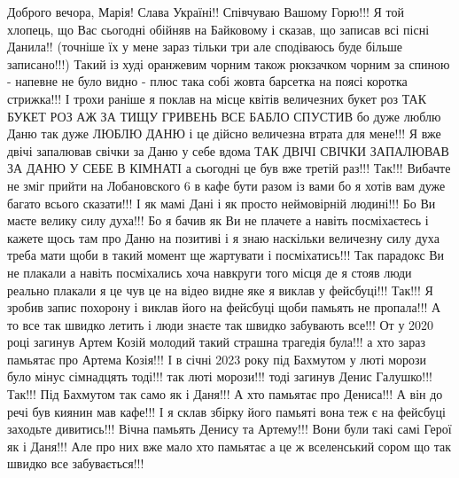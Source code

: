  
 
 
 
 

Доброго вечора, Марія! Слава Україні!! Співчуваю Вашому Горю!!! Я той хлопець,
що Вас сьогодні обійняв на Байковому і сказав, що записав всі пісні Данила!!
(точніше їх у мене зараз тільки три але сподіваюсь буде більше записано!!!)
Такий із худі оранжевим чорним також рюкзачком чорним за спиною - напевне не
було видно - плюс така собі жовта барсетка на поясі коротка стрижка!!! І трохи
раніше я поклав на місце квітів величезних букет роз ТАК БУКЕТ РОЗ АЖ ЗА ТИЩУ
ГРИВЕНЬ ВСЕ БАБЛО СПУСТИВ бо дуже люблю Даню так дуже ЛЮБЛЮ ДАНЮ і це дійсно
величезна втрата для мене!!! Я вже двічі запалював свічки за Даню у себе вдома
ТАК ДВІЧІ СВІЧКИ ЗАПАЛЮВАВ ЗА ДАНЮ У СЕБЕ В КІМНАТІ а сьогодні це був вже
третій раз!!!  Так!!!  Вибачте не зміг прийти на Лобановского 6 в кафе бути
разом із вами бо я хотів вам дуже багато всього сказати!!! І як мамі Дані і як
просто неймовірній людині!!! Бо Ви маєте велику силу духа!!!  Бо я бачив як Ви
не плачете а навіть посміхаєтесь і кажете щось там про Даню на позитиві і я
знаю наскільки величезну силу духа треба мати щоби в такий момент ще жартувати
і посміхатись!!! Так парадокс Ви не плакали а навіть посміхались хоча навкруги
того місця де я стояв люди реально плакали я це чув це на відео видне яке я
виклав у фейсбуці!!! Так!!! Я зробив запис похорону і виклав його на фейсбуці
щоби памьять не пропала!!!  А то все так швидко летить і люди знаєте так швидко
забувають все!!! От у 2020 році загинув Артем Козій молодий такий страшна
трагедія була!!!  а хто зараз памьятає про Артема Козія!!! І в січні 2023 року
під Бахмутом у люті морози було мінус сімнадцять тоді!!! так люті морози!!!
тоді загинув Денис Галушко!!! Так!!! Під Бахмутом так само як і Даня!!! А хто
памьятає про Дениса!!! А він до речі був киянин мав кафе!!! І я склав збірку
його памьяті вона теж є на фейсбуці заходьте дивитись!!! Вічна памьять Денису
та Артему!!!  Вони були такі самі Герої як і Даня!!!  Але про них вже мало хто
памьятає а це ж вселенський сором що так швидко все забувається!!!

